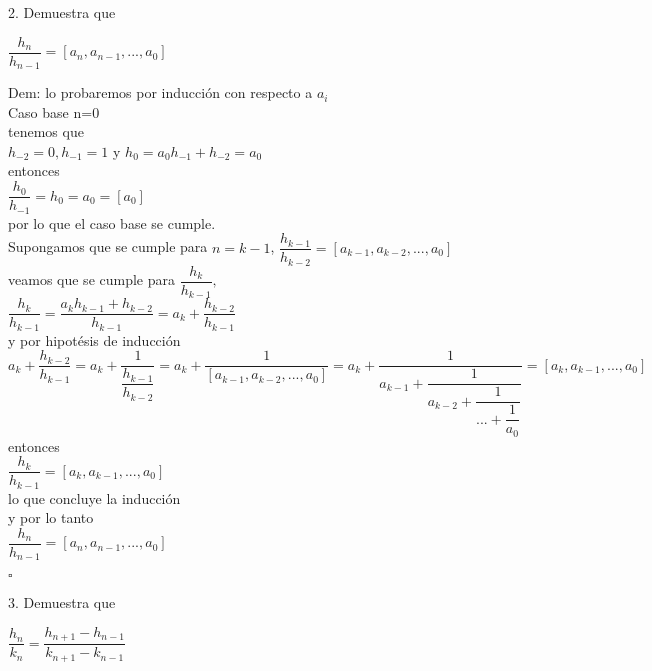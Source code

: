 \documentclass[11pt, article]{memoir}
\begin{document}
2. Demuestra que \\
\begin{center}
$\dfrac{h_{n}}{h_{n-1}}=[a_{n},a_{n-1},... ,{a_{0}}]$\\
\end{center}

Dem: lo probaremos por inducción con respecto a $a_{i}$\\
Caso base n=0\\
tenemos que\\
$h_{-2}=0, h_{-1}=1 $ y $ h_{0}=a_{0}h_{-1}+h_{-2}=a_{0}$\\
entonces\\
$\dfrac{h_{0}}{h_{-1}}=h_{0}=a_{0}=[a_{0}]$\\
por lo que el caso base se cumple.\\
Supongamos que se cumple para $n=k-1$, $\dfrac{h_{k-1}}{h_{k-2}}=[a_{k-1},a_{k-2},... ,{a_{0}}]$\\
veamos que se cumple para $\dfrac{h_{k}}{h_{k-1}},$\\
$\dfrac{h_{k}}{h_{k-1}}=\dfrac{a_{k}h_{k-1}+h_{k-2}}{h_{k-1}}=a_{k}+\dfrac{h_{k-2}}{h_{k-1}}$\\
y por hipotésis de inducción \\
$a_{k}+\dfrac{h_{k-2}}{h_{k-1}}=a_{k}+ \dfrac{1}{\dfrac{h_{k-1}}{h_{k-2}}}=a_{k}+ \dfrac{1}{[a_{k-1},a_{k-2},... ,{a_{0}}]}= a_{k}+\dfrac{1}{a_{k-1}+\dfrac{1}{a_{k-2}+\dfrac{1}{...+\dfrac{1}{a_{0}}}}}=[a_{k},a_{k-1},... ,{a_{0}}]$\\
entonces\\
$\dfrac{h_{k}}{h_{k-1}}=[a_{k},a_{k-1},... ,{a_{0}}]$\\
lo que concluye la inducción\\
y por lo tanto\\
$\dfrac{h_{n}}{h_{n-1}}=[a_{n},a_{n-1},... ,{a_{0}}]$
\begin{flushright}
$\square$
\end{flushright}

3. Demuestra que \\
\begin{center}
$\dfrac{h_{n}}{k_{n}}=\dfrac{h_{n+1}-h_{n-1}}{k_{n+1}-k_{n-1}}$\\
\end{center}
\end{document}
